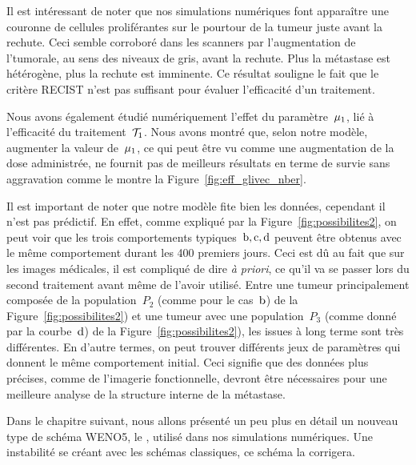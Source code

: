 \documentclass[main.tex]{subfiles}
\begin{document}
Il est intéressant de noter que nos simulations numériques font apparaître une couronne de cellules proliférantes sur le pourtour de la tumeur juste avant la rechute. Ceci semble corroboré dans les scanners par l'augmentation de l'\hetero tumorale, au sens des niveaux de gris, avant la rechute. Plus la métastase est hétérogène, plus la rechute est imminente. Ce résultat souligne le fait que le critère RECIST n'est pas suffisant pour évaluer l'efficacité d'un traitement.


Nous avons également étudié numériquement l'effet du paramètre~$\mu_1$, lié à l'efficacité du traitement~${\mathcal T_1}$. Nous avons montré que, selon notre modèle, augmenter la valeur de~$\mu_1$, ce qui peut être vu comme une augmentation de la dose administrée, ne fournit pas de meilleurs résultats en terme de survie sans aggravation comme le montre la Figure~\ref{fig:eff_glivec_nber}.


Il est important de noter que notre modèle fite bien les données, cependant il n'est pas prédictif. En effet, comme expliqué par la Figure~\ref{fig:possibilites2}, on peut voir que les trois comportements typiques~$\rm{b,c,d}$ peuvent être obtenus avec le même comportement durant les 400 premiers jours. Ceci est dû au fait que sur les images médicales, il est compliqué de dire {\it à priori}, ce qu'il va se passer lors du second traitement avant même de l'avoir utilisé. 
Entre une tumeur principalement composée de la population~$P_2$ (comme pour le cas~${\rm b}$) de la Figure~\ref{fig:possibilites2}) et une tumeur avec une population~$P_3$ (comme donné par la courbe~${\rm d}$) de la Figure~\ref{fig:possibilites2}), les issues à long terme sont très différentes. En d'autre termes, on peut trouver différents jeux de paramètres qui donnent le même comportement initial. Ceci signifie que des données plus précises, comme de l'imagerie fonctionnelle, devront être nécessaires pour une meilleure analyse de la structure interne de la métastase. 




Dans le chapitre suivant, nous allons présenté un peu plus en détail un nouveau type de schéma WENO5, le \twinweno, utilisé dans nos simulations numériques. Une instabilité se créant avec les schémas classiques, ce schéma la corrigera.
\end{document}

